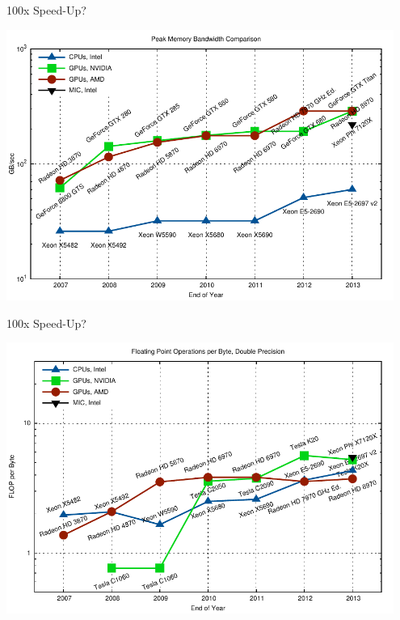 \begin{frame}{100x Speed-Up?}
 \begin{center} \includegraphics[width=0.95\textwidth]{figures/mem-bw} \end{center}
\end{frame}

\begin{frame}{100x Speed-Up?}
 \begin{center} \includegraphics[width=0.95\textwidth]{figures/flop-per-byte-dp} \end{center}
\end{frame}




